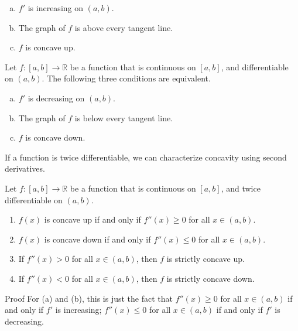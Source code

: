 \begin{example}{}
\begin{theorem}[label=thm230219_3]{}
\begin{enumerate}[(a)]
\item $f'$ is   increasing on $(a, b)$.
\item The graph of $f$ is   above every tangent line.
\item $f$ is  concave up.
\end{enumerate}
 
\end{theorem}

\begin{theorem}[label=thm230219_4]{}
 Let  $f:[a, b]\rightarrow\mathbb{R}$  be a   function that is continuous on $[a,b]$, and   differentiable on $(a, b)$. The following three conditions are equivalent.
\begin{enumerate}[(a)]

\item $f'$ is  decreasing on $(a, b)$.
\item The graph of $f$ is  below every tangent line.
\item $f$ is  concave down.
\end{enumerate}
 
\end{theorem}


If a function is twice differentiable, we can characterize concavity using second derivatives.
\begin{theorem}{}
 Let  $f:[a, b]\rightarrow\mathbb{R}$ be a function that is continuous on $[a,b]$, and twice differentiable on $(a, b)$.
 
\begin{enumerate}[1.]
\item $f(x)$ is   concave up if and only if $f''(x)\geq 0$ for all $x\in (a, b)$.
\item $f(x)$ is   concave down if and only if $f''(x)\leq 0$ for all $x\in (a, b)$.
\item If $f''(x)>0$ for all $x\in (a, b)$,  then $f$ is strictly concave up.

\item  If $f''(x)<0$ for all $x\in (a, b)$, then  $f$ is strictly concave down.

\end{enumerate}
\end{theorem}
\begin{myproof}{Proof}
For (a) and (b),  this is just the fact that $f''(x)\geq 0$ for all $x\in (a, b)$ if and only if $f'$ is increasing;  $f''(x)\leq 0$ for all $x\in (a, b)$ if and only if $f'$ is decreasing.


\end{myproof}
\end{example}
